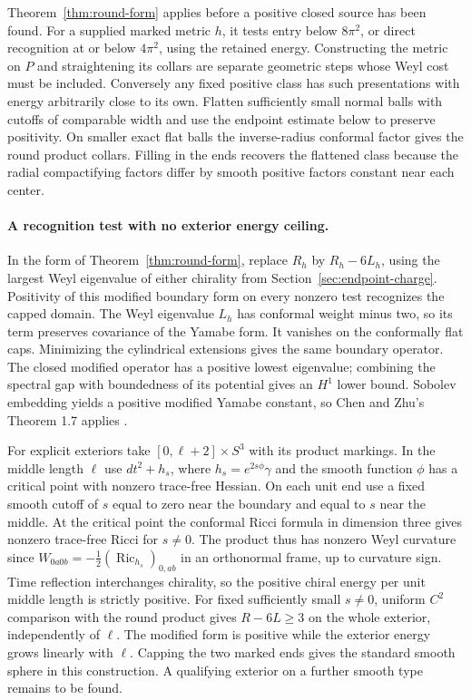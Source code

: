 \documentclass[11pt,letterpaper]{article}
\numberwithin{equation}{section}
\theoremstyle{remark}
\DeclareMathOperator{\Ric}{Ric}
\begin{document}
Theorem~\ref{thm:round-form} applies before a positive closed
source has been found. For a supplied marked metric \(h\),
it tests entry below \(8\pi^2\), or direct recognition at
or below \(4\pi^2\), using the retained energy. Constructing
the metric on \(P\) and straightening its collars are separate
geometric steps whose Weyl cost must be included. Conversely
any fixed positive class has such presentations with energy
arbitrarily close to its own. Flatten sufficiently small
normal balls with cutoffs of comparable width and use the
endpoint estimate below to preserve positivity. On smaller
exact flat balls the inverse-radius conformal factor gives
the round product collars. Filling in the ends recovers the
flattened class because the radial compactifying factors
differ by smooth positive factors constant near each center.

\paragraph{A recognition test with no exterior energy ceiling.}
In the form of Theorem~\ref{thm:round-form}, replace \(R_h\) by
\(R_h-6L_h\), using the largest Weyl eigenvalue of either chirality
from Section~\ref{sec:endpoint-charge}. Positivity of this modified
boundary form on every nonzero test recognizes the capped domain.
The Weyl eigenvalue \(L_h\) has conformal weight minus two, so its
term preserves covariance of the Yamabe form. It vanishes on the
conformally flat caps. Minimizing the cylindrical
extensions gives the same boundary operator. The closed modified
operator has a positive lowest eigenvalue; combining the spectral gap
with boundedness of its potential gives an \(H^1\) lower bound.
Sobolev embedding yields a positive modified Yamabe constant, so
Chen and Zhu's Theorem 1.7 applies \cite{ChenZhu2014Conformal}.

For explicit exteriors take \([0,\ell+2]\times S^3\) with its product
markings. In the middle length \(\ell\) use \(dt^2+h_s\), where
\(h_s=e^{2s\phi}\gamma\) and the smooth function \(\phi\) has a
critical point with nonzero trace-free Hessian. On each unit end use
a fixed smooth cutoff of \(s\) equal to zero near the boundary and
equal to \(s\) near the middle. At the critical point the conformal
Ricci formula in dimension three gives nonzero trace-free Ricci for
\(s\ne0\). The product thus has nonzero Weyl curvature since
\(W_{0a0b}=-\tfrac12(\Ric_{h_s})_{0,ab}\) in an orthonormal frame,
up to curvature sign. Time reflection interchanges chirality, so
the positive chiral energy per unit middle length is strictly positive.
For fixed sufficiently small \(s\ne0\), uniform \(C^2\) comparison
with the round product gives \(R-6L\ge3\) on the whole exterior,
independently of \(\ell\). The modified form is positive while the
exterior energy grows linearly with \(\ell\). Capping the two
marked ends gives the standard smooth sphere in this construction.
A qualifying exterior on a further smooth type remains to be found.
\end{document}
